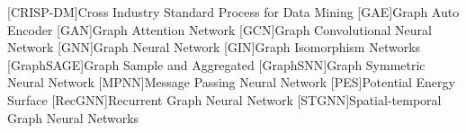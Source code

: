 \begin{acronym}[TestTestTestTest]\itemsep=-3pt
    [CRISP-DM]{Cross Industry Standard Process for Data Mining}    
    [GAE]{Graph Auto Encoder}
    [GAN]{Graph Attention Network}
    [GCN]{Graph Convolutional Neural Network}
    [GNN]{Graph Neural Network}
    [GIN]{Graph Isomorphism Networks}
    [GraphSAGE]{Graph Sample and Aggregated}
    [GraphSNN]{Graph Symmetric Neural Network}
    [MPNN]{Message Passing Neural Network}
    [PES]{Potential Energy Surface}
    [RecGNN]{Recurrent Graph Neural Network}
    [STGNN]{Spatial-temporal Graph Neural Networks}
     \end{acronym}